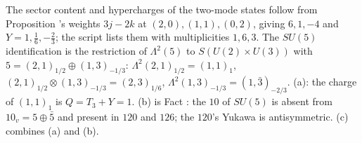 The sector content and hypercharges of the two-mode states follow from Proposition 's weights $3j - 2k$ at $(2,0), (1,1), (0,2)$, giving $6, 1, -4$ and $Y = 1, \tfrac16, -\tfrac23$; the script lists them with multiplicities $1, 6, 3$. The $SU(5)$ identification is the restriction of $\Lambda^{2}(5)$ to $S(U(2) \times U(3))$ with $5 = (2,1)_{1/2} \oplus (1,3)_{-1/3}$: $\Lambda^{2}(2,1)_{1/2} = (1,1)_{1}$, $(2,1)_{1/2} \otimes (1,3)_{-1/3} = (2,3)_{1/6}$, $\Lambda^{2}(1,3)_{-1/3} = (1,\bar{3})_{-2/3}$. (a): the charge of $(1,1)_{1}$ is $Q = T_{3} + Y = 1$. (b) is Fact : the $10$ of $SU(5)$ is absent from $10_{v} = 5 \oplus \bar{5}$ and present in $120$ and $126$; the $120$'s Yukawa is antisymmetric. (c) combines (a) and (b).
